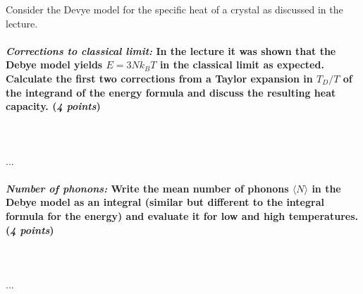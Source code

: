 Consider the Devye model for the specific heat of a crystal as discussed 
in the lecture.

\paragraph{\textit{Corrections to classical limit:} In the lecture it was 
    shown that the Debye model yields $E=3Nk_BT$ in the classical limit as 
    expected. Calculate the first two corrections from a Taylor expansion in 
    $T_D/T$ of the integrand of the energy formula and discuss the 
    resulting heat capacity. (\textit{4 points})
} \ \\
    \\
    ...

\paragraph{\textit{Number of phonons:} Write the mean number of phonons 
    $\langle N\rangle$ in the Debye model as an integral (similar but 
    different to the integral formula for the energy) and evaluate it for low 
    and high temperatures. (\textit{4 points})
} \ \\
    \\
    ...
